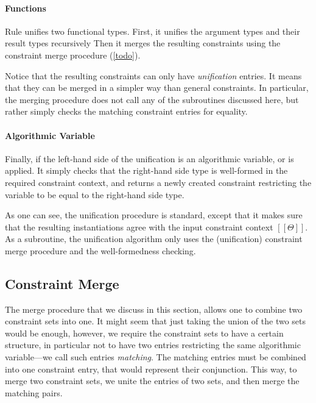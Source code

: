 \paragraph{Functions}
  Rule  unifies two functional types. 
  First, it unifies the argument types and their result types recursively
  Then it merges the resulting constraints using the constraint merge procedure (\cref{todo}).

  Notice that the resulting constraints can only have \emph{unification} entries.
  It means that they can be merged in a simpler way than general constraints.
  In particular, the merging procedure does not call any of the subroutines discussed here,
  but rather simply checks the matching constraint entries for equality.

\paragraph{Algorithmic Variable}
  Finally, if the left-hand side of the unification is an algorithmic variable,
   or  is applied. 
  It simply checks that the right-hand side type is well-formed in the required
  constraint context, and returns a newly created constraint restricting the variable
  to be equal to the right-hand side type.

\vspace{\baselineskip}
As one can see, the unification procedure is standard, 
except that it makes sure that the resulting instantiations agree with the input
constraint context $[[Θ]]$.  As a subroutine, the unification algorithm only uses the (unification) 
constraint merge procedure and the well-formedness checking.

\subsection{Constraint Merge}

The merge procedure that we discuss in this section, allows one to 
combine two constraint sets into one. It might seem that 
just taking the union of the two sets would be enough, however,
we require the constraint sets to have a certain structure,
in particular not to have two entries restricting the same algorithmic
 variable---we call such entries \emph{matching}.
The matching entries must be combined into one constraint entry, that 
would represent their conjunction. 
This way, to merge two constraint sets, we unite the entries of two
sets, and then merge the matching pairs.

